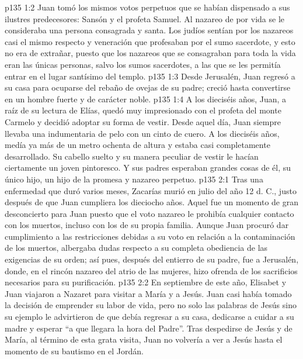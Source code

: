 \vs p135 1:2 Juan tomó los mismos votos perpetuos que se habían dispensado a sus ilustres predecesores: Sansón y el profeta Samuel. Al nazareo de por vida se le consideraba una persona consagrada y santa. Los judíos sentían por los nazareos casi el mismo respecto y veneración que profesaban por el sumo sacerdote, y esto no era de extrañar, puesto que los nazareos que se consagraban para toda la vida eran las únicas personas, salvo los sumos sacerdotes, a las que se les permitía entrar en el lugar santísimo del templo.
\vs p135 1:3 \pc Desde Jerusalén, Juan regresó a su casa para ocuparse del rebaño de ovejas de su padre; creció hasta convertirse en un hombre fuerte y de carácter noble.
\vs p135 1:4 A los dieciséis años, Juan, a raíz de su lectura de Elías, quedó muy impresionado con el profeta del monte Carmelo y decidió adoptar su forma de vestir. Desde aquel día, Juan siempre llevaba una indumentaria de pelo con un cinto de cuero. A los dieciséis años, medía ya más de un metro ochenta de altura y estaba casi completamente desarrollado. Su cabello suelto y su manera peculiar de vestir le hacían ciertamente un joven pintoresco. Y sus padres esperaban grandes cosas de él, su único hijo, un hijo de la promesa y nazareo perpetuo.
\vs p135 2:1 Tras una enfermedad que duró varios meses, Zacarías murió en julio del año 12 d. C., justo después de que Juan cumpliera los dieciocho años. Aquel fue un momento de gran desconcierto para Juan puesto que el voto nazareo le prohibía cualquier contacto con los muertos, incluso con los de su propia familia. Aunque Juan procuró dar cumplimiento a las restricciones debidas a su voto en relación a la contaminación de los muertos, albergaba dudas respecto a su completa obediencia de las exigencias de su orden; así pues, después del entierro de su padre, fue a Jerusalén, donde, en el rincón nazareo del atrio de las mujeres, hizo ofrenda de los sacrificios necesarios para su purificación.
\vs p135 2:2 \pc En septiembre de este año, Elisabet y Juan viajaron a Nazaret para visitar a María y a Jesús. Juan casi había tomado la decisión de emprender su labor de vida, pero no solo las palabras de Jesús sino su ejemplo le advirtieron de que debía regresar a su casa, dedicarse a cuidar a su madre y esperar “a que llegara la hora del Padre”. Tras despedirse de Jesús y de María, al término de esta grata visita, Juan no volvería a ver a Jesús hasta el momento de su bautismo en el Jordán.
